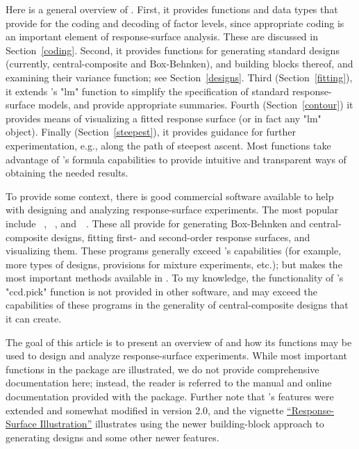 \documentclass[article,nojss]{jss}
\def\rsm{\pkg{rsm}}
\def\R{\proglang{R}}
\def\Sect#1{Section~\ref{#1}}
\begin{document}
Here is a general overview of \rsm{}.  First, it provides functions and data types that provide for the coding and decoding of factor levels, since appropriate coding is an important element of response-surface analysis.  These are discussed in \Sect{coding}.  Second, it provides functions for generating standard designs (currently, central-composite and Box-Behnken), and building blocks thereof, and examining their variance function; see \Sect{designs}.  Third (\Sect{fitting}), it extends \R's "lm" function to simplify the specification of standard response-surface models, and provide appropriate summaries.  Fourth (\Sect{contour}) it provides means of visualizing a fitted response surface (or in fact any "lm" object).  Finally (\Sect{steepest}), it provides guidance for further experimentation, e.g., along the path of steepest ascent.  Most \rsm{} functions take advantage of \R's formula capabilities to provide intuitive and transparent ways of obtaining the needed results.

To provide some context, there is good commercial software available to help with designing and analyzing
response-surface experiments.  The most popular include ~\citep{DEsoft},
~\citep{JMPsoft}, and~~\citep{SGsoft}.  These all provide for generating Box-Behnken and central-composite designs, fitting first- and second-order response surfaces, and visualizing them.  These programs generally exceed \rsm's capabilities (for example, more types of designs, provisions for mixture experiments, etc.); but \rsm{} makes the most important methods available in \R.  To my knowledge, the functionality of \rsm's "ccd.pick" function is not provided in other software, and \rsm{} may exceed the capabilities of these programs in the generality of central-composite designs that it can create.

The goal of this article is to present an overview of \rsm{} and how its functions may be used to design and analyze response-surface experiments.  While most important functions in the package are illustrated, we do not provide comprehensive documentation here; instead, the reader is referred to the manual and online documentation provided with the package. Further note that 's features were extended and somewhat modified in version 2.0, and the vignette \href{rs-illus.pdf}{``Response-Surface Illustration''} illustrates using the newer building-block approach to generating designs and some other newer features.
\end{document}
